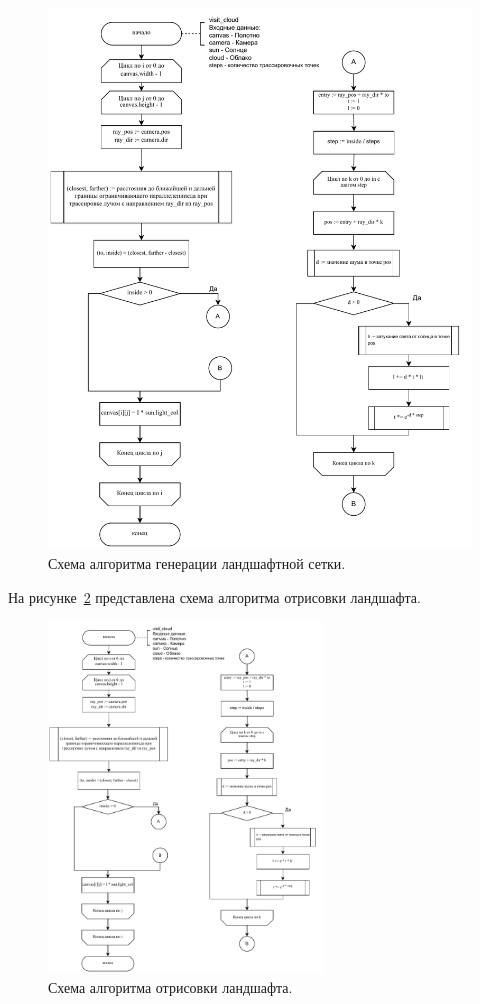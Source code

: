 \begin{figure}[ht!]
	\centering
	\includegraphics[width=1.0\textwidth, page=3]{assets/img/cloud_flowchart.pdf}   
	\caption{Схема алгоритма генерации ландшафтной сетки.}
	\label{fig:cloud_fc2}
\end{figure}
\clearpage
На рисунке~\ref{fig:cloud_fc3} представлена схема алгоритма отрисовки ландшафта.
\begin{figure}[ht!]
	\centering
	\includegraphics[width=0.65\textwidth, page=4]{assets/img/cloud_flowchart.pdf}   
	\caption{Схема алгоритма отрисовки ландшафта.}
	\label{fig:cloud_fc3}
\end{figure}
\clearpage
